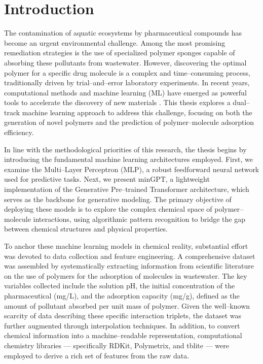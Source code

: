 \chapter*{Introduction}
\pagestyle{plain}

The contamination of aquatic ecosystems by pharmaceutical compounds has become an urgent environmental challenge. Among the most promising remediation strategies is the use of specialized polymer sponges capable of absorbing these pollutants from wastewater. However, discovering the optimal polymer for a specific drug molecule is a complex and time--consuming process, traditionally driven by trial--and--error laboratory experiments. In recent years, computational methods and machine learning (ML) have emerged as powerful tools to accelerate the discovery of new materials \cite{AIPoweredMaterialScience}. This thesis explores a dual--track machine learning approach to address this challenge, focusing on both the generation of novel polymers and the prediction of polymer--molecule adsorption efficiency.

In line with the methodological priorities of this research, the thesis begins by introducing the fundamental machine learning architectures employed. First, we examine the Multi--Layer Perceptron (MLP), a robust feedforward neural network used for predictive tasks. Next, we present minGPT, a lightweight implementation of the Generative Pre--trained Transformer architecture, which serves as the backbone for generative modeling. The primary objective of deploying these models is to explore the complex chemical space of polymer--molecule interactions, using algorithmic pattern recognition to bridge the gap between chemical structures and physical properties.

To anchor these machine learning models in chemical reality, substantial effort was devoted to data collection and feature engineering. A comprehensive dataset was assembled by systematically extracting information from scientific literature on the use of polymers for the adsorption of molecules in wastewater. The key variables collected include the solution pH, the initial concentration of the pharmaceutical (mg/L), and the adsorption capacity (mg/g), defined as the amount of pollutant absorbed per unit mass of polymer.  Given the well--known scarcity of data describing these specific interaction triplets, the dataset was further augmented through interpolation techniques. In addition, to convert chemical information into a machine--readable representation, computational chemistry libraries — specifically RDKit, Polymetrix, and tblite — were employed to derive a rich set of features from the raw data.


